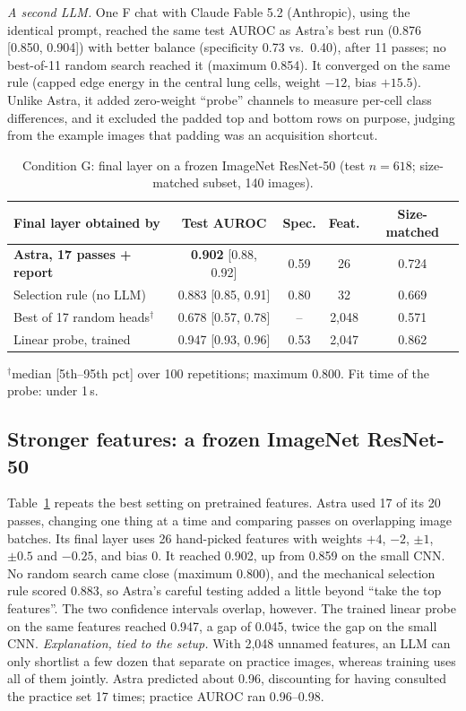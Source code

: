\textit{A second LLM.} One F chat with Claude Fable 5.2 (Anthropic), using the identical prompt, reached the same test AUROC as Astra's best run (0.876 [0.850, 0.904]) with better balance (specificity 0.73 vs.\ 0.40), after 11 passes; no best-of-11 random search reached it (maximum 0.854).
It converged on the same rule (capped edge energy in the central lung cells, weight $-12$, bias $+15.5$).
Unlike Astra, it added zero-weight ``probe'' channels to measure per-cell class differences, and it excluded the padded top and bottom rows on purpose, judging from the example images that padding was an acquisition shortcut.

\begin{table}[t]
\centering
\caption{Condition G: final layer on a frozen ImageNet ResNet-50 (test $n{=}618$; size-matched subset, 140 images).}
\label{tab:g}
\setlength{\tabcolsep}{2.2pt}
\footnotesize
\begin{tabular}{@{}lcccc@{}}
\toprule
Final layer obtained by & Test AUROC & Spec. & Feat. & Size-matched \\
\midrule
\textbf{Astra, 17 passes + report} & \textbf{0.902} {\scriptsize[0.88, 0.92]} & 0.59 & 26 & 0.724 \\
Selection rule (no LLM) & 0.883 {\scriptsize[0.85, 0.91]} & 0.80 & 32 & 0.669 \\
Best of 17 random heads$^\dagger$ & 0.678 {\scriptsize[0.57, 0.78]} & -- & 2,048 & 0.571 \\
Linear probe, trained & 0.947 {\scriptsize[0.93, 0.96]} & 0.53 & 2,047 & 0.862 \\
\bottomrule
\end{tabular}

\vspace{2pt}
\raggedright\scriptsize $^\dagger$median [5th--95th pct] over 100 repetitions; maximum 0.800. Fit time of the probe: under 1\,s.
\end{table}

\subsection{Stronger features: a frozen ImageNet ResNet-50}\label{sec:g}
Table~\ref{tab:g} repeats the best setting on pretrained features.
Astra used 17 of its 20 passes, changing one thing at a time and comparing passes on overlapping image batches.
Its final layer uses 26 hand-picked features with weights $+4$, $-2$, $\pm1$, $\pm0.5$ and $-0.25$, and bias 0.
It reached 0.902, up from 0.859 on the small CNN.
No random search came close (maximum 0.800), and the mechanical selection rule scored 0.883, so Astra's careful testing added a little beyond ``take the top features''.
The two confidence intervals overlap, however.
The trained linear probe on the same features reached 0.947, a gap of 0.045, twice the gap on the small CNN.
\emph{Explanation, tied to the setup.} With 2,048 unnamed features, an LLM can only shortlist a few dozen that separate on practice images, whereas training uses all of them jointly.
Astra predicted about 0.96, discounting for having consulted the practice set 17 times; practice AUROC ran 0.96--0.98.

